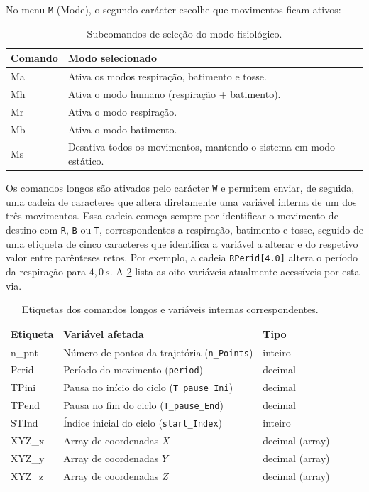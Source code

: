 No menu \texttt{M} (Mode), o segundo carácter escolhe que movimentos ficam ativos:

\begin{table}[H]
  \centering
  \caption{Subcomandos de seleção do modo fisiológico.}
  \label{tab:comandos-modo}
  \begin{tabular}{@{}>{\ttfamily}lp{10.2cm}@{}}
    \toprule
    \normalfont Comando & Modo selecionado\\
    \midrule
    Ma & Ativa os modos respiração, batimento e tosse.\\
    Mh & Ativa o modo humano (respiração + batimento).\\
    Mr & Ativa o modo respiração.\\
    Mb & Ativa o modo batimento.\\
    Ms & Desativa todos os movimentos, mantendo o sistema em modo estático.\\
    \bottomrule
  \end{tabular}
\end{table}

Os comandos longos são ativados pelo carácter \texttt{W} e permitem enviar, de seguida, uma cadeia de caracteres que altera diretamente uma variável interna de um dos três movimentos. Essa cadeia começa sempre por identificar o movimento de destino com \texttt{R}, \texttt{B} ou \texttt{T}, correspondentes a respiração, batimento e tosse, seguido de uma etiqueta de cinco caracteres que identifica a variável a alterar e do respetivo valor entre parênteses retos. Por exemplo, a cadeia \texttt{RPerid[4.0]} altera o período da respiração para \(4,0\,s\). A \cref{tab:comandos-longos} lista as oito variáveis atualmente acessíveis por esta via.

\begin{table}[H]
  \centering
  \caption{Etiquetas dos comandos longos e variáveis internas correspondentes.}
  \label{tab:comandos-longos}
  \begin{tabular}{@{}>{\ttfamily}lll@{}}
    \toprule
    \normalfont Etiqueta & \normalfont Variável afetada & \normalfont Tipo\\
    \midrule
    n\_pnt & Número de pontos da trajetória (\texttt{n\_Points}) & inteiro\\
    Perid & Período do movimento (\texttt{period}) & decimal\\
    TPini & Pausa no início do ciclo (\texttt{T\_pause\_Ini}) & decimal\\
    TPend & Pausa no fim do ciclo (\texttt{T\_pause\_End}) & decimal\\
    STInd & Índice inicial do ciclo (\texttt{start\_Index}) & inteiro\\
    XYZ\_x & Array de coordenadas \(X\) & decimal (array)\\
    XYZ\_y & Array de coordenadas \(Y\) & decimal (array)\\
    XYZ\_z & Array de coordenadas \(Z\) & decimal (array)\\
    \bottomrule
  \end{tabular}
\end{table}

